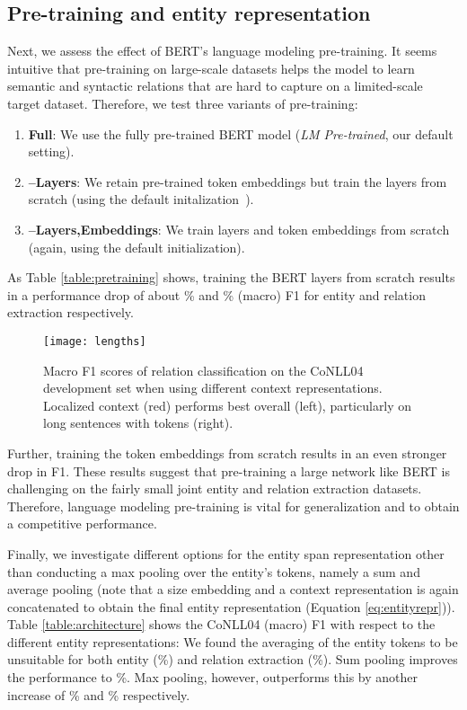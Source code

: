\documentclass{ecai}
\begin{document}
\subsection{Pre-training and entity representation}

Next, we assess the effect of BERT's language modeling pre-training. It seems intuitive that pre-training on large-scale datasets helps the model to learn semantic and syntactic relations that are hard to capture on a limited-scale target dataset. Therefore, we test three variants of pre-training:
\begin{enumerate}
    \item {\bf Full}: We use the fully pre-trained BERT model (\emph{LM Pre-trained}, our default setting).
    \item {\bf --Layers}: We retain pre-trained token embeddings but train the layers from scratch (using the default initalization~\cite{devlin:2018:bert}).
    \item {\bf --Layers,Embeddings}: We train layers and token embeddings from scratch (again, using the default initialization).
\end{enumerate} 


As Table \ref{table:pretraining} shows, training the BERT layers from scratch results in a performance drop of about \% and \% (macro) F1 for entity and relation extraction respectively.

\begin{figure}[ht!]
    \centering
    \texttt{[image: lengths]}
    \caption{Macro F1 scores of relation classification on the CoNLL04 development set when using different context representations. Localized context (red) performs best overall (left), particularly on long sentences with  tokens (right).
}
        \label{fig:localized_context}
\end{figure}

Further, training the token embeddings from scratch results in an even stronger drop in F1. These results suggest that pre-training a large network like BERT is challenging on the fairly small joint entity and relation extraction datasets. Therefore, language modeling pre-training is vital for generalization and to obtain a competitive performance.


Finally, we investigate different options for the entity span representation  other than conducting a max pooling over the entity's tokens, namely a sum and average pooling (note that a size embedding and a context representation is again concatenated to obtain the final entity representation (Equation \ref{eq:entityrepr})).
Table \ref{table:architecture} shows the CoNLL04 (macro) F1 with respect to the different entity representations: We found the averaging of the entity tokens to be unsuitable for both entity (\%) and relation extraction (\%). Sum pooling improves the performance to \%. Max pooling, however, outperforms this by another increase of \% and \% respectively.
\end{document}
